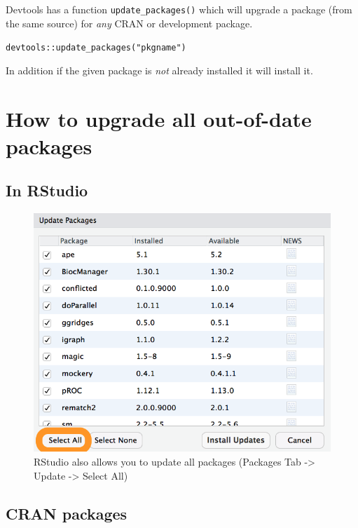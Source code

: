 \documentclass[
  letterpaper,
]{book}
\begin{document}
Devtools has a function \texttt{update\_packages()} which will upgrade a
package (from the same source) for \emph{any} CRAN or development
package.

\texttt{devtools::update\_packages("pkgname")}

In addition if the given package is \emph{not} already installed it will
install it.

\hypertarget{how-to-upgrade-all-out-of-date-packages}{%
\section{How to upgrade all out-of-date
packages}\label{how-to-upgrade-all-out-of-date-packages}}

\hypertarget{in-rstudio-1}{%
\subsection{In RStudio}\label{in-rstudio-1}}

\begin{figure}

{\centering \includegraphics{./images/rstudio-update-all.png}

}

\caption{RStudio also allows you to update all packages (Packages Tab
-\textgreater{} Update -\textgreater{} Select All)}

\end{figure}

\hypertarget{cran-packages}{%
\subsection{CRAN packages}\label{cran-packages}}
\end{document}
